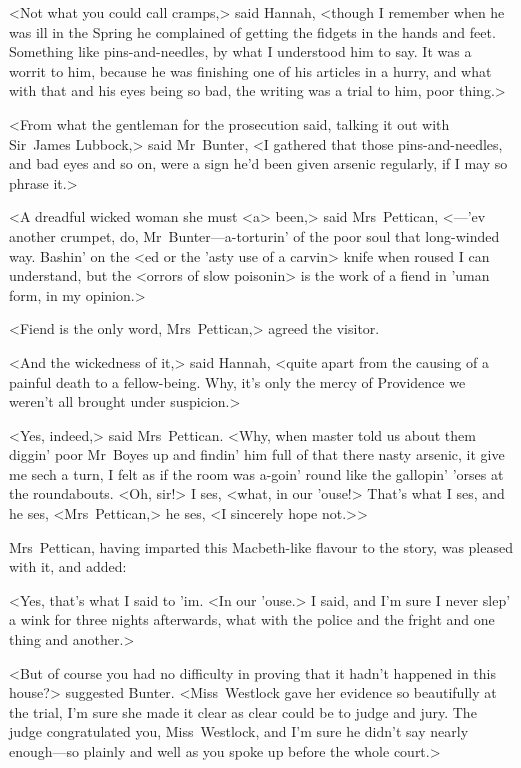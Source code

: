 <Not what you could call cramps,> said Hannah, <though I remember when he was ill in the Spring he complained of getting the fidgets in the hands and feet. Something like pins-and-needles, by what I understood him to say. It was a worrit to him, because he was finishing one of his articles in a hurry, and what with that and his eyes being so bad, the writing was a trial to him, poor thing.>

<From what the gentleman for the prosecution said, talking it out with Sir~James Lubbock,> said Mr~Bunter, <I gathered that those pins-and-needles, and bad eyes and so on, were a sign he'd been given arsenic regularly, if I may so phrase it.>

<A dreadful wicked woman she must <a> been,> said Mrs~Pettican, <—'ev another crumpet, do, Mr~Bunter—a-torturin' of the poor soul that long-winded way. Bashin' on the <ed or the 'asty use of a carvin> knife when roused I can understand, but the <orrors of slow poisonin> is the work of a fiend in 'uman form, in my opinion.>

<Fiend is the only word, Mrs~Pettican,> agreed the visitor.

<And the wickedness of it,> said Hannah, <quite apart from the causing of a painful death to a fellow-being. Why, it's only the mercy of Providence we weren't all brought under suspicion.>

<Yes, indeed,> said Mrs~Pettican. <Why, when master told us about them diggin' poor Mr~Boyes up and findin' him full of that there nasty arsenic, it give me sech a turn, I felt as if the room was a-goin' round like the gallopin' 'orses at the roundabouts. <Oh, sir!> I ses, <what, in our 'ouse!> That's what I ses, and he ses, <Mrs~Pettican,> he ses, <I sincerely hope not.>>

Mrs~Pettican, having imparted this Macbeth-like flavour to the story, was pleased with it, and added:

<Yes, that's what I said to 'im. <In our 'ouse.> I said, and I'm sure I never slep' a wink for three nights afterwards, what with the police and the fright and one thing and another.>

<But of course you had no difficulty in proving that it hadn't happened in this house?> suggested Bunter. <Miss~Westlock gave her evidence so beautifully at the trial, I'm sure she made it clear as clear could be to judge and jury. The judge congratulated you, Miss~Westlock, and I'm sure he didn't say nearly enough—so plainly and well as you spoke up before the whole court.>

